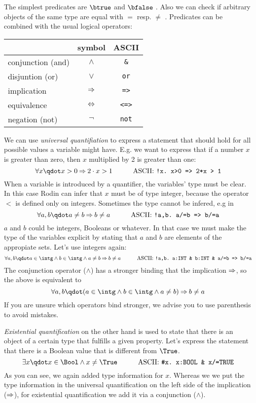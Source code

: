 The simplest predicates are $\btrue$  and $\bfalse$ .
Also we can check if arbitrary objects of the same type are equal with $=$ resp. $\neq$
\inascii{/=}.
Predicates can be combined with the usual logical operators:
\begin{center}
  \begin{tabular}{lcc}
                      & symbol   & ASCII \\
    \hline
    conjunction (and) & $\land$  & \texttt{\&} \\
    disjuntion (or)   & $\lor$   & \texttt{or} \\
    implication       & $\mathbin\Rightarrow$  & \texttt{=>} \\
    equivalence       & $\mathbin\Leftrightarrow$  & \texttt{<=>} \\
    negation (not)    & $\lnot$  & \texttt{not} \\
  \end{tabular}
\end{center}
We can use \emph{universal quantifiation} to express a statement that should hold for all possible values
a variable might have. E.g. we want to express that if a number $x$ is greater than zero,
then $x$ multiplied by 2 is greater than one:
\[ \forall x \qdot x>0 \limp 2\cdot x > 1 \lascii{!x.\ x>0\ =>\ 2*x\ >\ 1}\]
When a variable is introduced by a quantifier, the variables' type must be clear.
In this case Rodin can infer that $x$ must be of type integer, because the operator $<$ 
is defined only on integers. Sometimes the type cannot be infered, e.g in
\[ \forall a,b \qdot a\neq b \limp b\neq a \lascii{!a,b.\ a/=b\ =>\ b/=a} \]
$a$ and $b$ could be integers, Booleans or whatever.
In that case we must make the type of the variables explicit by stating that $a$ and $b$ are elements
of the appropiate sets. Let's use integers again:
\[ \forall a,b \qdot a\in\intg \land b\in\intg \land a\neq b \limp b\neq a \lascii{!a,b.\ a:INT \& b:INT \& a/=b => b/=a} \]
The conjunction operator ($\land$) has a stronger binding that the implication $\mathbin\Rightarrow$, so the above is equivalent to
\[ \forall a,b \qdot (a\in\intg \land b\in\intg \land a\neq b) \limp b\neq a\]
If you are unsure which operators bind stronger, we advise you to use parenthesis to avoid mistakes.

\emph{Existential quantification} on the other hand is used to state that there is an object of a certain type that
fulfills a given property. Let's express the statement that there is a Boolean value that is different from
$\True$.
\[ \exists x \qdot x\in\Bool \land x\neq\True \lascii{\#x.\ x:BOOL\ \&\ x/=TRUE} \]
As you can see, we again added type information for $x$. Whereas we we put the type information in the universal
quantification on the left side of the implication ($\mathbin\Rightarrow$), 
for existential quantification we add it via a conjunction ($\land$).

